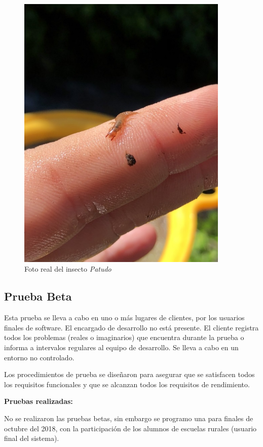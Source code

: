 		\begin{figure}[H]
			\centering
				\includegraphics[width=0.9\textwidth]{imagenes/testAlpha/6.JPG}
					\caption{Foto real del insecto \textit{Patudo}}
		\end{figure}
		
	\subsection{Prueba Beta}

		Esta prueba se lleva a cabo en uno o más lugares de clientes, por los usuarios finales de software. El encargado de desarrollo no está presente. El cliente registra todos los problemas (reales o imaginarios) que  encuentra durante la prueba o informa a intervalos regulares al equipo de desarrollo. Se lleva a cabo en un entorno no controlado.

		Los procedimientos de prueba se diseñaron para asegurar que se satisfacen todos los requisitos funcionales y que se alcanzan todos los requisitos de rendimiento.
		\newline

		\textbf{Pruebas realizadas:}
		
		No se realizaron las pruebas betas, sin embargo se programo una para finales de octubre del 2018, con la participación de los alumnos de escuelas rurales (usuario final del sistema).
